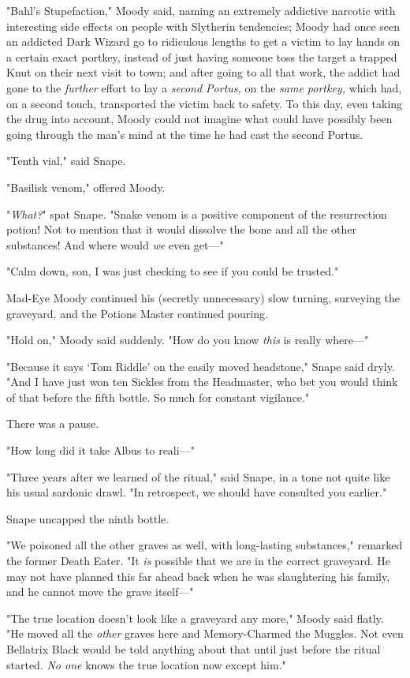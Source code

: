 "Bahl's Stupefaction," Moody said, naming an extremely addictive narcotic with
interesting side effects on people with Slytherin tendencies; Moody had once
seen an addicted Dark Wizard go to ridiculous lengths to get a victim to lay
hands on a certain exact portkey, instead of just having someone toss the
target a trapped Knut on their next visit to town; and after going to all that
work, the addict had gone to the \emph{further} effort to lay a \emph{second
Portus,} on the \emph{same portkey,} which had, on a second touch, transported
the victim back to safety. To this day, even taking the drug into account,
Moody could not imagine what could have possibly been going through the man's
mind at the time he had cast the second Portus.

"Tenth vial," said Snape.

"Basilisk venom," offered Moody.

"\emph{What?}" spat Snape. "Snake venom is a positive component of the
resurrection potion! Not to mention that it would dissolve the bone and all the
other substances! And where would \emph{we} even get—"

"Calm down, son, I was just checking to see if you could be trusted."

Mad-Eye Moody continued his (secretly unnecessary) slow turning, surveying the
graveyard, and the Potions Master continued pouring.

"Hold on," Moody said suddenly. "How do you know \emph{this} is really where—"

"Because it says `Tom Riddle' on the easily moved headstone," Snape said dryly.
"And I have just won ten Sickles from the Headmaster, who bet you would think
of that before the fifth bottle. So much for constant vigilance."

There was a pause.

"How long did it take Albus to reali—"

"Three years after we learned of the ritual," said Snape, in a tone not quite
like his usual sardonic drawl. "In retrospect, we should have consulted you
earlier."

Snape uncapped the ninth bottle.

"We poisoned all the other graves as well, with long-lasting substances,"
remarked the former Death Eater. "It \emph{is} possible that we are in the
correct graveyard. He may not have planned this far ahead back when he was
slaughtering his family, and he cannot move the grave itself—"

"The true location doesn't look like a graveyard any more," Moody said flatly.
"He moved all the \emph{other} graves here and Memory-Charmed the Muggles. Not
even Bellatrix Black would be told anything about that until just before the
ritual started. \emph{No one} knows the true location now except him."

